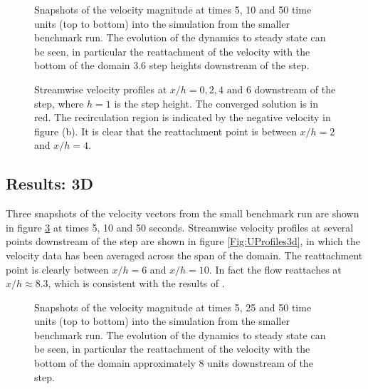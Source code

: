 \begin{figure}
\centering
{}
\caption{Snapshots of the velocity magnitude at times 5, 10 and 50 time units (top to bottom) into the simulation
from the smaller benchmark run.
The evolution of the dynamics to steady state can be seen, in particular the reattachment of the velocity with the bottom of the domain 3.6 step heights downstream of the step.}
\label{Fig:Vectors}
\end{figure}

\begin{figure}
\centering
{}
\caption{Streamwise velocity profiles at $x/h=0, 2, 4 \text{ and } 6$ downstream of the step,
where $h=1$ is the step height. The converged solution is in red.
The recirculation region is indicated by the negative velocity in figure (b).
It is clear that the reattachment point is between $x/h=2$ and $x/h=4$.}
\label{Fig:UProfiles2d}
\end{figure}


\subsection{Results: 3D}
Three snapshots of the velocity vectors from the small benchmark run
are shown in figure \ref{Fig:Vectors} at times 5, 10 and 50 seconds.
Streamwise velocity profiles at several points downstream of the step are shown in figure
\ref{Fig:UProfiles3d}, in which the velocity data has been averaged across the span of the domain.
The reattachment point is clearly between $x/h=6$ and $x/h=10$.
In fact the flow reattaches at $x/h \approx 8.3$, which is consistent with the results of \cite{le1997}.


\begin{figure}
\centering
{}
\caption{Snapshots of the velocity magnitude at times 5, 25 and 50 time units (top to bottom) into the simulation
from the smaller benchmark run.
The evolution of the dynamics to steady state can be seen, in particular the reattachment of the velocity with the bottom of the domain approximately 8 units downstream of the step.}
\label{Fig:Vectors}
\end{figure}

